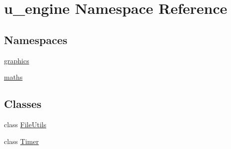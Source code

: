 \hypertarget{namespaceu__engine}{}\section{u\+\_\+engine Namespace Reference}
\label{namespaceu__engine}
\subsection*{Namespaces}
\begin{DoxyCompactItemize}
\item 
 \hyperlink{namespaceu__engine_1_1graphics}{graphics}
\item 
 \hyperlink{namespaceu__engine_1_1maths}{maths}
\end{DoxyCompactItemize}
\subsection*{Classes}
\begin{DoxyCompactItemize}
\item 
class \hyperlink{classu__engine_1_1_file_utils}{File\+Utils}
\item 
class \hyperlink{classu__engine_1_1_timer}{Timer}
\end{DoxyCompactItemize}
